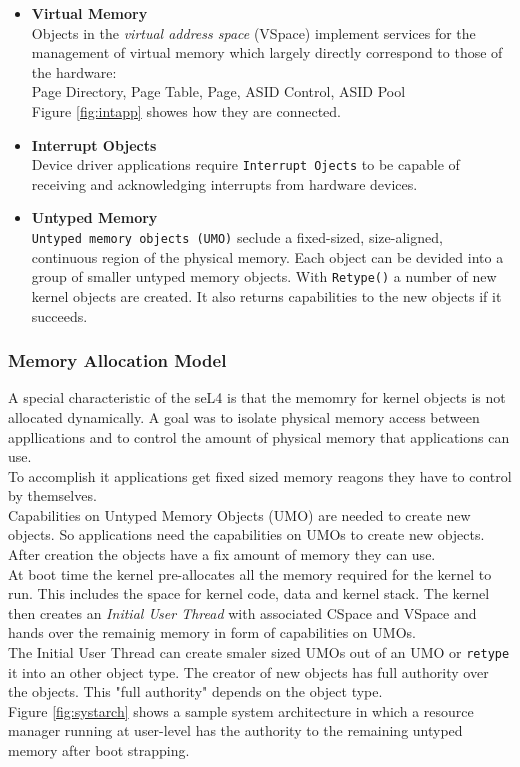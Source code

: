 \documentclass[11pt,a4paper,twoside]{article}
\begin{document}
\begin{itemize}
	\item \textbf{Virtual Memory}\\
	Objects in the \textit{virtual address space} (VSpace) implement services for the management of virtual memory which largely directly correspond to those of the hardware: \\
	Page Directory, Page Table, Page, ASID Control, ASID Pool \\
	Figure \ref{fig:intapp} showes how they are connected.
	\item \textbf{Interrupt Objects} \\
	Device driver applications require \texttt{Interrupt Ojects} to be capable of receiving and acknowledging interrupts from hardware devices.
	\item \textbf{Untyped Memory} \\
	\texttt{Untyped memory objects (UMO)} seclude a fixed-sized, size-aligned, continuous region of the physical memory. Each object can be devided into a group of smaller untyped memory objects. With \texttt{Retype()} a number of new kernel objects are created. It also returns capabilities to the new objects if it succeeds. 
	\end{itemize}
	\subsubsection{Memory Allocation Model} 
	A special characteristic of the seL4 is that the memomry for kernel objects is not allocated dynamically. A goal was to isolate physical memory access between appllications and to control the amount of physical memory that applications can use. \\
	To accomplish it applications get fixed sized memory reagons they have to control by themselves. \\
	Capabilities on Untyped Memory Objects (UMO) are needed to create new objects. So applications need the capabilities on UMOs to create new objects. After creation the objects have a fix amount of memory they can use. \\
	At boot time the kernel pre-allocates all the memory required for the kernel to run. This includes the space for kernel code, data and kernel stack. The kernel then creates an \textit{Initial User Thread} with associated CSpace and VSpace and hands over the remainig memory in form of capabilities on UMOs. \\
	The Initial User Thread can create smaler sized UMOs out of an UMO or \texttt{retype} it into an other object type. The creator of new objects has full authority over the objects. This "full authority" depends on the object type. \\
	Figure \ref{fig:systarch} shows a sample system architecture in which a resource manager running at user-level  has the authority to the remaining untyped memory after boot strapping. 
	
\end{document}
